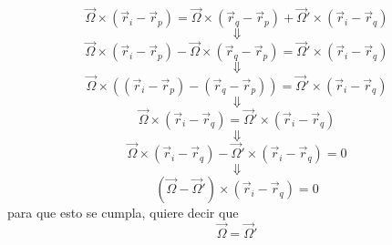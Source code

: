 \documentclass[../Main.tex]{subfiles}
\begin{document}
\npage{
}
{

    \begin{equation*}
        \vec{\Omega} \times \left( \vec{r}_{i} - \vec{r}_{p} \right) = \vec{\Omega} \times \left( \vec{r}_{q} - \vec{r}_{p} \right) + \vec{\Omega}' \times \left( \vec{r}_{i} - \vec{r}_{q} \right)
    \end{equation*}
    \begin{equation*}
        \Downarrow
    \end{equation*}
    \begin{equation*}
        \vec{\Omega} \times \left( \vec{r}_{i} - \vec{r}_{p} \right) - \vec{\Omega} \times \left( \vec{r}_{q} - \vec{r}_{p} \right) = \vec{\Omega}' \times \left( \vec{r}_{i} - \vec{r}_{q} \right)
    \end{equation*}
    \begin{equation*}
        \Downarrow
    \end{equation*}
    \begin{equation*}
        \vec{\Omega} \times \left( \left( \vec{r}_{i} - \vec{r}_{p} \right) - \left( \vec{r}_{q} - \vec{r}_{p} \right) \right) = \vec{\Omega}' \times \left( \vec{r}_{i} - \vec{r}_{q} \right)
    \end{equation*}
    \begin{equation*}
        \Downarrow
    \end{equation*}
    \begin{equation*}
        \vec{\Omega} \times \left( \vec{r}_{i} - \vec{r}_{q} \right) = \vec{\Omega}' \times \left( \vec{r}_{i} - \vec{r}_{q} \right)
    \end{equation*}
    \begin{equation*}
        \Downarrow
    \end{equation*}
    \begin{equation*}
        \vec{\Omega} \times \left( \vec{r}_{i} - \vec{r}_{q} \right) - \vec{\Omega}' \times \left( \vec{r}_{i} - \vec{r}_{q} \right) = 0
    \end{equation*}
    \begin{equation*}
        \Downarrow
    \end{equation*}
    \begin{equation*}
        \left( \vec{\Omega} - \vec{\Omega}' \right) \times \left( \vec{r}_{i} - \vec{r}_{q} \right) = 0
    \end{equation*}
    para que esto se cumpla, quiere decir que
    \begin{equation*}
        \vec{\Omega} = \vec{\Omega}'
    \end{equation*}

}
\end{document}

